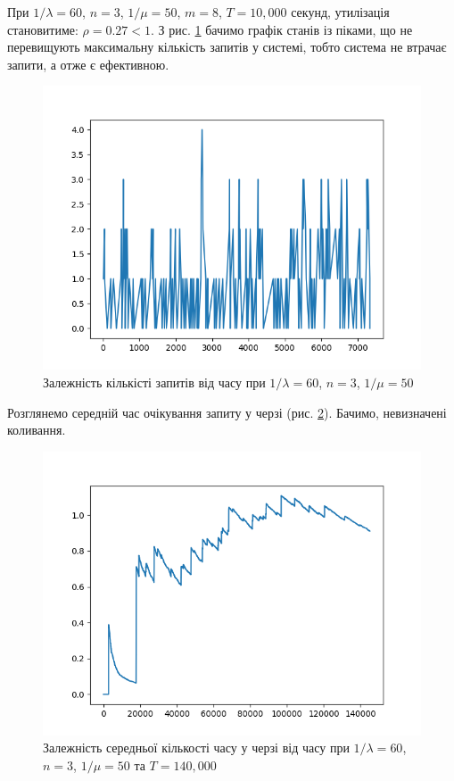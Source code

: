 \documentclass[14pt]{extarticle}
\begin{document}
При \(1 / \lambda = 60\), \(n = 3\), \(1 / \mu = 50\), \(m = 8\), \(T = 10,000\) секунд,
утилізація становитиме: \(\rho = 0.27 < 1\). З рис. \ref{img:exp-first-requests}
бачимо графік станів із піками, що не перевищують максимальну кількість запитів
у системі, тобто система не втрачає запити, а отже є ефективною.

\begin{figure}
  \centering
  \includegraphics{10_000_seconds-requests_in_system.png}\caption{{Залежність кількісті
      запитів від часу при \(1/\lambda = 60\), \(n = 3\),
      \(1/\mu = 50\)}}\label{img:exp-first-requests}
\end{figure}

Розглянемо середній час очікування запиту у черзі (рис.
\ref{img:exp-queue-length-mean-10-000}). Бачимо, невизначені коливання.

\begin{figure}[h!]
  \centering
  \includegraphics{10_000_seconds-waiting_mean.png}\caption{{Залежність
      середньої кількості часу у черзі від часу при \(1/\lambda = 60\), \(n = 3\),
      \(1/\mu = 50\) та
      \(T = 140,000\)}}\label{img:exp-queue-length-mean-10-000}
\end{figure}
\end{document}
